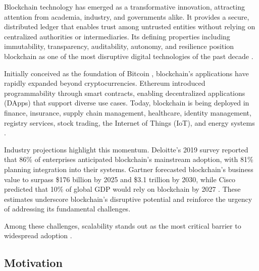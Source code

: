 
\vspace{12pt}

Blockchain technology has emerged as a transformative innovation, attracting attention from academia, industry, and governments alike. It provides a secure, distributed ledger that enables trust among untrusted entities without relying on centralized authorities or intermediaries. Its defining properties including immutability, transparency, auditability, autonomy, and resilience position blockchain as one of the most disruptive digital technologies of the past decade \cite{sanka2021systematic}.

\vspace{12pt}

Initially conceived as the foundation of Bitcoin  \cite{nakamoto2008bitcoin}, blockchain’s applications have rapidly expanded beyond cryptocurrencies. Ethereum \cite{buterin2014ethereum} introduced programmability through smart contracts, enabling decentralized applications (DApps) that support diverse use cases. Today, blockchain is being deployed in finance, insurance, supply chain management, healthcare, identity management, registry services, stock trading, the Internet of Things (IoT), and energy systems \cite{sanka2021systematic}.

\vspace{12pt}

Industry projections highlight this momentum. Deloitte’s 2019 survey reported that 86\% of enterprises anticipated blockchain’s mainstream adoption, with 81\% planning integration into their systems. Gartner forecasted blockchain’s business value to surpass \$176 billion by 2025 and \$3.1 trillion by 2030, while Cisco predicted that 10\% of global GDP would rely on blockchain by 2027 \cite{nakamoto2008bitcoin}. These estimates underscore blockchain’s disruptive potential and reinforce the urgency of addressing its fundamental challenges.

\vspace{12pt}

Among these challenges, scalability stands out as the most critical barrier to widespread adoption \cite{slogix2025scalability}.
\vspace{6pt}
\subsection{Motivation}
\vspace{6pt}

